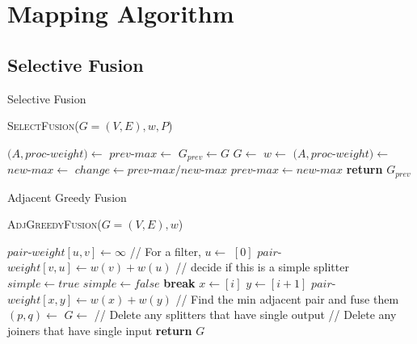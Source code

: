 \section{Mapping Algorithm}

\subsection{Selective Fusion}
\begin{algorithm}
\caption{Selective Fusion} \label {alg:select_fus}
\textsc{SelectFusion}($G = (V, E), w, P$)
\begin{algorithmic}[1]
\State $(A, proc$-$weight) \gets $  
\State $prev$-$max \gets $ 
\Repeat
	\State $G_{prev} \gets G$
	\State $G \gets $ 
	\State $w \gets $ 
	\State $(A, proc$-$weight) \gets $ 
	\State $new$-$max \gets $ 
	\State $change \gets prev$-$max / new$-$max $
	\State $prev$-$max \gets new$-$max$
\State \textbf{return} $G_{prev}$
\end{algorithmic}
\end{algorithm}

\begin{algorithm}
\caption{Adjacent Greedy Fusion} \label {alg:adj_fus}
\textsc{AdjGreedyFusion}($G = (V, E), w$)
\begin{algorithmic}[1]
		\State $pair$-$weight[u,v] \gets \infty$
	\EndFor
\EndFor
{}
\Statex // For a filter, 
		\State $u \gets $ $[0]$
		\State $pair$-$weight[v,u] \gets w(v) + w(u)$
		\Statex // decide if this is a simple splitter
		\State $simple \gets true$			
				\State $simple \gets false$
				\State \textbf{break}
			\EndIf
		\EndFor
				\State $x \gets $$[i]$
				\State $y \gets $$[i + 1]$
				\State $pair$-$weight[x,y] \gets w(x) + w(y)$
			\EndFor 
		\EndIf
	\EndIf
\EndFor
\Statex // Find the min adjacent pair and fuse them
\State $(p, q) \gets $ 
\State $G \gets $ 
\Statex // Delete any splitters that have single output
\State {}
\Statex // Delete any joiners that have single input
\State {}
\State \textbf{return} $G$
\end{algorithmic}
\end{algorithm}

